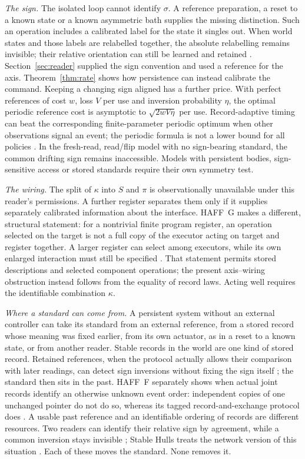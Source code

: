 \documentclass[11pt,a4paper]{article}
\begin{document}
\emph{The sign.} The isolated loop cannot identify $\sigma$. A reference preparation, a reset to a known state or a known asymmetric bath supplies the missing distinction. Such an operation includes a calibrated label for the state it singles out. When world states and those labels are relabelled together, the absolute relabelling remains invisible; their relative orientation can still be learned and retained \cite{TDIII}. Section~\ref{sec:reader} supplied the sign convention and used a reference for the axis. Theorem~\ref{thm:rate} shows how persistence can instead calibrate the command. Keeping a changing sign aligned has a further price. With perfect references of cost $w$, loss $V$ per use and inversion probability $\eta$, the optimal periodic reference cost is asymptotic to $\sqrt{2wV\eta}$ per use. Record-adaptive timing can beat the corresponding finite-parameter periodic optimum when other observations signal an event; the periodic formula is not a lower bound for all policies \cite{TDIII}. In the fresh-read, read/flip model with no sign-bearing standard, the common drifting sign remains inaccessible. Models with persistent bodies, sign-sensitive access or stored standards require their own symmetry test.

\emph{The wiring.} The split of $\kappa$ into $S$ and $\pi$ is observationally unavailable under this reader's permissions. A further register separates them only if it supplies separately calibrated information about the interface. HAFF~G makes a different, structural statement: for a nontrivial finite program register, an operation selected on the target is not a full copy of the executor acting on target and register together. A larger register can select among executors, while its own enlarged interaction must still be specified \cite{HAFFG}. That statement permits stored descriptions and selected component operations; the present axis--wiring obstruction instead follows from the equality of record laws. Acting well requires the identifiable combination $\kappa$.

\emph{Where a standard can come from.} A persistent system without an external controller can take its standard from an external reference, from a stored record whose meaning was fixed earlier, from its own actuator, as in a reset to a known state, or from another reader. Stable records in the world are one kind of stored record. Retained references, when the protocol actually allows their comparison with later readings, can detect sign inversions without fixing the sign itself \cite{TDIII}; the standard then sits in the past. HAFF~F separately shows when actual joint records identify an otherwise unknown event order: independent copies of one unchanged pointer do not do so, whereas its tagged record-and-exchange protocol does \cite{HAFFF}. A usable past reference and an identifiable ordering of records are different resources. Two readers can identify their relative sign by agreement, while a common inversion stays invisible \cite{TDIII}; Stable Hulls treats the network version of this situation \cite{StableHulls}. Each of these moves the standard. None removes it.
\end{document}
